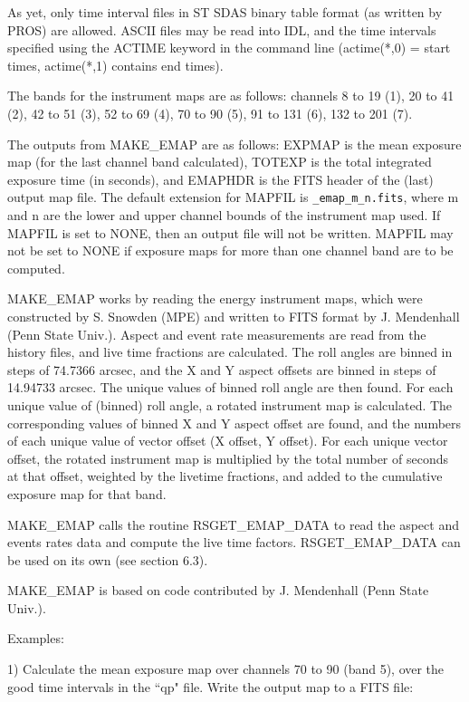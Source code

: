As yet, only time interval files in ST SDAS binary table format (as written
by PROS) are allowed. ASCII files may be read into IDL, and the time
intervals specified using the ACTIME keyword in the command line
(actime(*,0) = start times, actime(*,1) contains end times).
 
The bands for the instrument maps are as follows: channels 8 to 19 (1), 20
to 41 (2), 42 to 51 (3), 52 to 69 (4), 70 to 90 (5), 91 to 131 (6), 132 to
201 (7).
 
The outputs from MAKE{\_}EMAP are as follows: EXPMAP is the mean exposure map
(for the last channel band calculated), TOTEXP is the total integrated
exposure time (in seconds), and EMAPHDR is the FITS header of the (last)
output map file. The default extension for MAPFIL is {\tt {\_}emap{\_}m{\_}n.fits},
where m and n are the lower and upper channel bounds of the instrument map
used. If MAPFIL is set to NONE, then an output file will not be written.
MAPFIL may not be set to NONE if exposure maps for more than one channel
band are to be computed.
 
MAKE{\_}EMAP works by reading the energy instrument maps, which were
constructed by S. Snowden (MPE) and written to FITS format by J. Mendenhall
(Penn State Univ.). Aspect and event rate measurements are read from the
history files, and live time fractions are calculated. The roll angles are
binned in steps of 74.7366 arcsec, and the X and Y aspect offsets are
binned in steps of 14.94733 arcsec. The unique values of binned roll angle
are then found. For each unique value of (binned) roll angle, a rotated
instrument map is calculated. The corresponding values of binned X and Y
aspect offset are found, and the numbers of each unique value of vector
offset (X offset, Y offset). For each unique vector offset, the rotated
instrument map is multiplied by the total number of seconds at that offset,
weighted by the livetime fractions, and added to the cumulative exposure
map for that band.
 
MAKE{\_}EMAP calls the routine RSGET{\_}EMAP{\_}DATA to read the aspect and events
rates data and compute the live time factors. RSGET{\_}EMAP{\_}DATA can be used
on its own (see section 6.3).
 
MAKE{\_}EMAP is based on code contributed by J. Mendenhall (Penn State Univ.).
 
Examples:
 
1) Calculate the mean exposure map over channels 70 to 90 (band 5), over
the good time intervals in the ``qp" file. Write the output map to a FITS
file:

